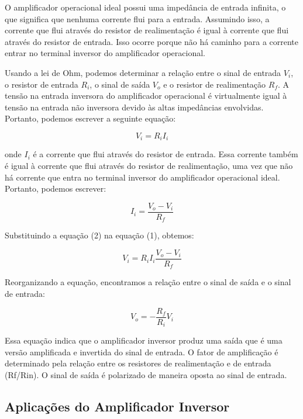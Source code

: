 \documentclass[12pt,twoside, a4paper, twocolumn]{article}
\begin{document}
O amplificador operacional ideal possui uma impedância de entrada infinita, o que significa que nenhuma corrente flui para a entrada. Assumindo isso, a corrente que flui através do resistor de realimentação é igual à corrente que flui através do resistor de entrada. Isso ocorre porque não há caminho para a corrente entrar no terminal inversor do amplificador operacional.


Usando a lei de Ohm, podemos determinar a relação entre o sinal de entrada $V_i$, o resistor de entrada $R_i$, o sinal de saída $V_o$ e o resistor de realimentação $R_f$. A tensão na entrada inversora do amplificador operacional é virtualmente igual à tensão na entrada não inversora devido às altas impedâncias envolvidas. Portanto, podemos escrever a seguinte equação:


\begin{equation}
    V_i = R_i I_i
\end{equation}


onde $I_i$ é a corrente que flui através do resistor de entrada. Essa corrente também é igual à corrente que flui através do resistor de realimentação, uma vez que não há corrente que entra no terminal inversor do amplificador operacional ideal. Portanto, podemos escrever:


\begin{equation}
    I_i = \frac{V_o - V_i}{R_f}
\end{equation}


Substituindo a equação (2) na equação (1), obtemos:


\begin{equation}
    V_i = R_i I_i \frac{V_o - V_i}{R_f}
\end{equation}


Reorganizando a equação, encontramos a relação entre o sinal de saída e o sinal de entrada:


\begin{equation}
    V_o = - \frac{R_f}{R_i} V_i
\end{equation}


Essa equação indica que o amplificador inversor produz uma saída que é uma versão amplificada e invertida do sinal de entrada. O fator de amplificação é determinado pela relação entre os resistores de realimentação e de entrada (Rf/Rin). O sinal de saída é polarizado de maneira oposta ao sinal de entrada.


\subsection{Aplicações do Amplificador Inversor}
\end{document}
